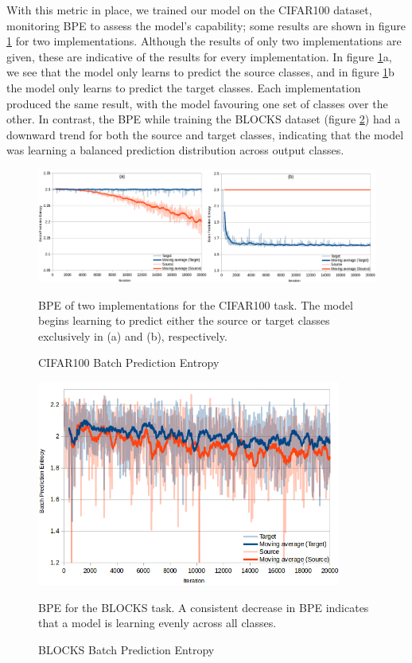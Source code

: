 \documentclass{report}
\begin{document}
With this metric in place, we trained our model on the CIFAR100 dataset, monitoring BPE to assess the model's capability; some results are shown in figure \ref{fig:totalbatchpredgraph:1} for two implementations. Although the results of only two implementations are given, these are indicative of the results for every implementation. In figure \ref{fig:totalbatchpredgraph:1}a, we see that the model only learns to predict the source classes, and in figure \ref{fig:totalbatchpredgraph:1}b the model only learns to predict the target classes. Each implementation produced the same result, with the model favouring one set of classes over the other. In contrast, the BPE while training the BLOCKS dataset (figure \ref{fig:totalbatchpredgraphblocks:1}) had a downward trend for both the source and target classes, indicating that the model was learning a balanced prediction distribution across output classes. \par
\begin{figure}[h!]
	\centering
	\includegraphics[width=17.5cm]{totalbatchpredgraph}
	\caption{CIFAR100 Batch Prediction Entropy}
	BPE of two implementations for the CIFAR100 task. The model begins learning to predict either the source or target classes exclusively in (a) and (b), respectively.
	\label{fig:totalbatchpredgraph:1}
\end{figure}

\begin{figure}[h!]
	\centering
	\includegraphics[width=10cm]{totalbatchpredgraphblocks}
	\caption{BLOCKS Batch Prediction Entropy}
	BPE for the BLOCKS task. A consistent decrease in BPE indicates that a model is learning evenly across all classes.
	\label{fig:totalbatchpredgraphblocks:1}
\end{figure}
\end{document}
